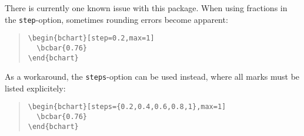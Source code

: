 \documentclass{article}
\begin{document}
There is currently one known issue with this package. When using fractions in the \texttt{step}-option, sometimes rounding errors become apparent:
\begin{quote}\small
\begin{verbatim}
\begin{bchart}[step=0.2,max=1]
  \bcbar{0.76}
\end{bchart}
\end{verbatim}
\end{quote}
\begin{quote}
\begin{bchart}[step=0.2,max=1]
\end{bchart}
\end{quote}
As a workaround, the \texttt{steps}-option can be used instead, where all marks must be listed explicitely:
\begin{quote}\small
\begin{verbatim}
\begin{bchart}[steps={0.2,0.4,0.6,0.8,1},max=1]
  \bcbar{0.76}
\end{bchart}
\end{verbatim}
\end{quote}
\begin{quote}
\begin{bchart}[steps={0.2,0.4,0.6,0.8,1},max=1]
\end{bchart}
\end{quote}
\end{document}
